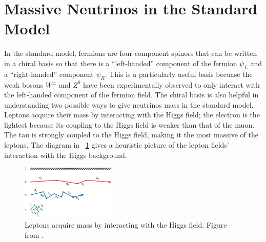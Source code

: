 \section{Massive Neutrinos in the Standard Model}
\label{sec:mVd}

In the standard model, fermions are four-component spinors that can be written in a chiral basis so that there is a ``left-handed'' component of the fermion $\psi_L$ and a ``right-handed'' component $\psi_R$.  This is a particularly useful basis becuase the weak bosons $W^{\pm}$ and $Z^0$ have been experimentally observed to only interact with the left-handed component of the fermion field.  The chiral basis is also helpful in understanding two possible ways to give neutrinos mass in the standard model.  Leptons acquire their mass by interacting with the Higgs field; the electron is the lightest because its coupling to the Higgs field is weaker than that of the muon.  The tau is strongly coupled to the Higgs field, making it the most massive of the leptons.  The diagram in {\fig}~\ref{fig:leptonMass} gives a heuristic picture of the lepton fields' interaction with the Higgs background.  
\begin{figure}[htp]
\centering
\includegraphics[width=0.4\textwidth]{figures/leptonMass.eps}
\caption{Leptons acquire mass by interacting with the Higgs field.  Figure from \cite{neutrinoMass}.}
\label{fig:leptonMass}
\end{figure}
